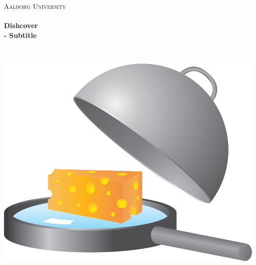 \begin{titlingpage}\centering

\textsc{\LARGE Aalborg University}\\[0.3cm]

\HRule \\[0.4cm]
{\huge \bfseries Dishcover}\\[0.5cm]
{\Large \bfseries - Subtitle}

\HRule \\[2cm]

\begin{minipage}{\columnwidth}
\hspace*{2.5cm}\includegraphics[width=0.85\linewidth]{img/dishcover.png}
\end{minipage}


\end{titlingpage}
